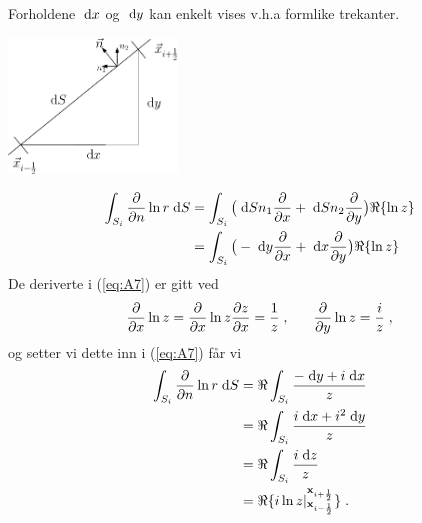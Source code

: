 \documentclass[a4paper,norsk]{article}
\begin{document}
\noindent\begin{minipage}{.45\textwidth}
Forholdene $\;\mathrm{d} x$ og $\;\mathrm{d} y$ kan enkelt vises v.h.a formlike trekanter.
\end{minipage}\hfill
\begin{minipage}{.45\textwidth}
\includegraphics[width=4.5cm]{dxdydS.eps}
\end{minipage}

\begin{align}
  \int_{S_i} \frac{\partial }{\partial n}\ln r\;\mathrm{d} S &= \int_{S_i} \big(\;\mathrm{d} Sn_1\frac{\partial }{\partial x} +
                              \;\mathrm{d} Sn_2\frac{\partial }{\partial y}\big) \Re\{\ln z\} \notag \\
    &= \int_{S_i} \big(-\;\mathrm{d} y\frac{\partial }{\partial x} +\;\mathrm{d} x\frac{\partial }{\partial y}\big) \Re\{\ln z\}
    \label{eq:A7}
\end{align}
De deriverte i (\ref{eq:A7}) er gitt ved
\begin{align*}
  \frac{\partial }{\partial x}\ln z = \frac{\partial }{\partial x}\ln z\frac{\partial z}{\partial x} = \frac{1}{z} \;,\hspace{6mm}
                    \frac{\partial }{\partial y}\ln z=\frac{i}{z} \;,
\end{align*}
og setter vi dette inn i (\ref{eq:A7}) får vi
\begin{align}
  \int_{S_i} \frac{\partial }{\partial n}\ln r\;\mathrm{d} S &= \Re \int_{S_i} \frac{-\;\mathrm{d} y + i\;\mathrm{d} x}{z} \notag\\
   &= \Re \int_{S_i} \frac{i\;\mathrm{d} x + i^2\;\mathrm{d} y }{z} \notag\\
   &= \Re \int_{S_i} \frac{i\;\mathrm{d} z}{z} \notag\\
   &= \Re \{i\ln z |_{\mathbf{x}_{i-\frac{1}{2}}}^{\mathbf{x}_{i+\frac{1}{2}}}\} \label{eq:A8}\;. 
\end{align}
\end{document}
